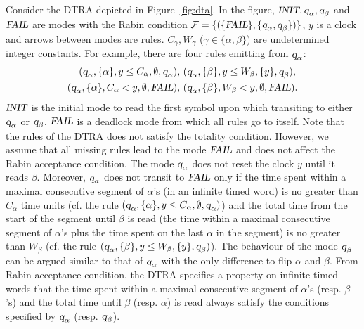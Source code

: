 \begin{example}\label{ex:dta}
Consider the DTRA depicted in Figure~\ref{fig:dta}.
In the figure, $\mbox{\sl INIT},\mbox{\sl q}_{\alpha},\mbox{\sl q}_{\beta}$ and $\mbox{\sl FAIL}$ are modes with the Rabin condition
$
    \mathcal{F}
    =
    \{
        (\{ \mbox{\sl FAIL} \},
        \{
            \mbox{\sl q}_{\alpha},
            \mbox{\sl q}_{\beta}
        \})
    \}
$, $y$ is a clock and arrows between modes are rules.
$C_\gamma,W_\gamma$ ($\gamma\in\{\alpha,\beta\}$) are undetermined integer constants.
For example, there are four rules emitting from $\mbox{\sl q}_{\alpha}$:
\begin{align*}
(\mbox{\sl q}_{\alpha}, \{ \alpha \}, y \le C_\alpha,\emptyset, \mbox{\sl q}_{\alpha}),& ~(\mbox{\sl q}_{\alpha}, \{ \beta \}, y \le W_\beta, \{ y \}, \mbox{\sl q}_{\beta}),\\
(\mbox{\sl q}_{\alpha}, \{ \alpha \}, C_\alpha<y,\emptyset, \mbox{\sl FAIL}),& ~(\mbox{\sl q}_{\alpha}, \{ \beta \}, W_\beta<y, \emptyset, \mbox{\sl FAIL}).
\end{align*}
$\mbox{\sl INIT}$ is the initial mode to read the first symbol upon which transiting to either $\mbox{\sl q}_{\alpha}$ or $\mbox{\sl q}_{\beta}$.
$\mbox{\sl FAIL}$ is a deadlock mode from which all rules go to itself.
Note that the rules of the DTRA does not satisfy the totality condition.
However, we assume that all missing rules lead to the mode $\mbox{\sl FAIL}$ and does not affect the Rabin acceptance condition.
The mode $\mbox{\sl q}_{\alpha}$ does not reset the clock $y$ until it reads $\beta$.
Moreover, $\mbox{\sl q}_{\alpha}$ does not transit to $\mbox{\sl FAIL}$ only if the time spent within a maximal consecutive segment of $\alpha$'s (in an infinite timed word) is no greater than $C_\alpha$ time units (cf. the rule $(\mbox{\sl q}_{\alpha}, \{ \alpha \}, y \le C_\alpha,\emptyset, \mbox{\sl q}_{\alpha})$) and the total time from the start of the segment until $\beta$ is read (the time within a maximal consecutive segment of $\alpha$'s plus the time spent on the last $\alpha$ in the segment) is no greater than $W_\beta$
(cf. the rule $(\mbox{\sl q}_{\alpha}, \{ \beta \}, y \le W_\beta, \{ y \}, \mbox{\sl q}_{\beta})$).
The behaviour of the mode $\mbox{\sl q}_{\beta}$ can be argued similar to that of $\mbox{\sl q}_{\alpha}$ with the only difference to
flip $\alpha$ and $\beta$.
From Rabin acceptance condition, the DTRA specifies a property on infinite timed words that the time spent within a maximal consecutive segment of $\alpha$'s (resp. $\beta$'s) and the total time until $\beta$ (resp. $\alpha$) is read
always satisfy the conditions specified by $\mbox{\sl q}_{\alpha}$ (resp. $\mbox{\sl q}_{\beta}$).
\end{example}

